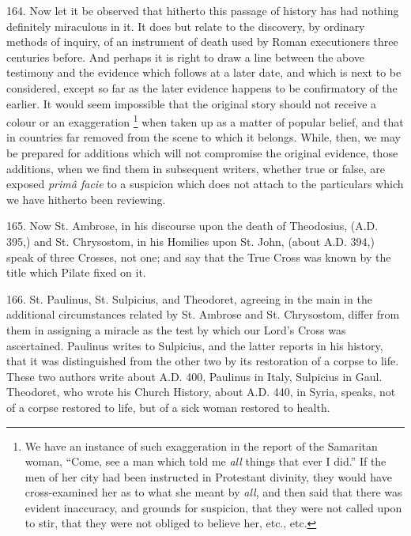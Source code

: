 164.
Now let it be observed that hitherto this passage of history has had
nothing definitely miraculous in it. It does but relate to the
discovery, by ordinary methods of inquiry, of an instrument of death
used by Roman executioners three centuries before. And perhaps it is
right to draw a line between the above testimony and the evidence
which follows at a later date, and which is next to be considered,
except so far as the later evidence happens to be confirmatory of the
earlier. It would seem impossible that the original story should not
receive a colour or an exaggeration \footnote{We have an instance of such exaggeration in the report of the
Samaritan woman, ``Come, see a man which told me \emph{all} things that ever I
did.'' If the men of her city had been instructed in Protestant
divinity, they would have cross-examined her as to what she meant by \emph{all},
and then said that there was evident inaccuracy, and grounds for
suspicion, that they were not called upon to stir, that they were not
obliged to believe her, etc., etc.} when taken up as a matter of popular belief, and that in
countries far removed from the scene to which it belongs. While, then,
we may be prepared for additions which will not compromise the
original evidence, those additions, when we find them in subsequent
writers, whether true or false, are exposed \emph{primâ facie} to a
suspicion which does not attach to the particulars which we have
hitherto been reviewing.

165.
Now St. Ambrose, in his discourse upon the death of Theodosius, (A.D.
395,) and St. Chrysostom, in his Homilies upon St. John, (about A.D.
394,) speak of three Crosses, not one; and say that the True Cross was
known by the title which Pilate fixed on it.

166.
St. Paulinus, St. Sulpicius, and Theodoret, agreeing in the main in
the additional circumstances related by St. Ambrose and St. Chrysostom,
differ from them in assigning a miracle as the test by which our Lord's
Cross was ascertained. Paulinus writes to Sulpicius, and the latter
reports in his history, that it was distinguished from the other two
by its restoration of a corpse to life. These two authors write about A.D.
400, Paulinus in Italy, Sulpicius in Gaul. Theodoret, who wrote his
Church History, about A.D. 440,
in Syria, speaks, not of a corpse restored to life, but of a sick
woman restored to health.

